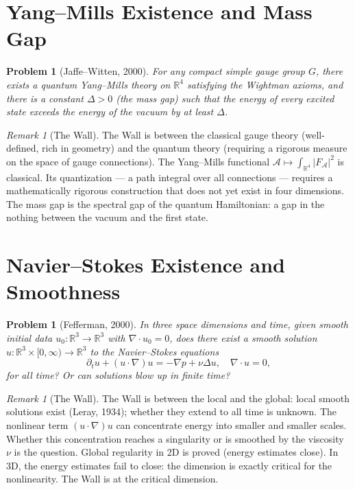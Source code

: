\documentclass[12pt]{article}
\newtheorem{problem}[theorem]{Problem}
\theoremstyle{definition}
\theoremstyle{remark}
\newtheorem{remark}[theorem]{Remark}
\begin{document}
\section{Yang--Mills Existence and Mass Gap}

\begin{problem}[Jaffe--Witten, 2000]
For any compact simple gauge group $G$,
there exists a quantum Yang--Mills theory on $\mathbb{R}^4$
satisfying the Wightman axioms,
and there is a constant $\Delta > 0$ (the \emph{mass gap})
such that the energy of every excited state
exceeds the energy of the vacuum by at least $\Delta$.
\end{problem}

\begin{remark}[The Wall]
The Wall is between the classical gauge theory
(well-defined, rich in geometry)
and the quantum theory
(requiring a rigorous measure on the space of gauge connections).
The Yang--Mills functional
$\mathcal{A} \mapsto \int_{\mathbb{R}^4} |F_\mathcal{A}|^2$
is classical.
Its quantization --- a path integral over all connections ---
requires a mathematically rigorous construction
that does not yet exist in four dimensions.
The mass gap is the spectral gap of the quantum Hamiltonian:
a gap in the nothing \cite{nothing} between the vacuum and the first state.
\end{remark}

\section{Navier--Stokes Existence and Smoothness}

\begin{problem}[Fefferman, 2000]
In three space dimensions and time,
given smooth initial data $u_0: \mathbb{R}^3 \to \mathbb{R}^3$
with $\nabla \cdot u_0 = 0$,
does there exist a smooth solution $u: \mathbb{R}^3 \times [0,\infty) \to \mathbb{R}^3$
to the Navier--Stokes equations
\[
\partial_t u + (u \cdot \nabla) u = -\nabla p + \nu \Delta u,
\quad \nabla \cdot u = 0,
\]
for all time? Or can solutions blow up in finite time?
\end{problem}

\begin{remark}[The Wall]
The Wall is between the local and the global:
local smooth solutions exist (Leray, 1934);
whether they extend to all time is unknown.
The nonlinear term $(u \cdot \nabla)u$
can concentrate energy into smaller and smaller scales.
Whether this concentration reaches a singularity
or is smoothed by the viscosity $\nu$
is the question.
Global regularity in 2D is proved (energy estimates close).
In 3D, the energy estimates fail to close:
the dimension is exactly critical for the nonlinearity.
The Wall is at the critical dimension.
\end{remark}
\end{document}
